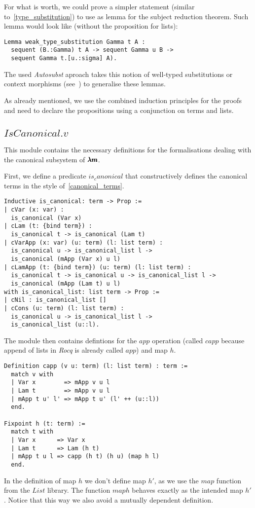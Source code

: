 For what is worth, we could prove a simpler statement (similar to~\cref{type_substitution}) to use as lemma for the subject reduction theorem.
Such lemma would look like (without the proposition for lists):
\begin{lstlisting}[language=Coq]
Lemma weak_type_substitution Gamma t A :
  sequent (B.:Gamma) t A -> sequent Gamma u B ->
  sequent Gamma t.[u.:sigma] A).
\end{lstlisting}

The used \textit{Autosubst} aproach takes this notion of well-typed substitutions or context morphisms (see~\cite[Chapter~4]{AutosubstSchafer}) to generalise these lemmas.

As already mentioned, we use the combined induction principles for the proofs and need to declare the propositions using a conjunction on terms and lists.

\subsection{\lst$IsCanonical.v$}

This module contains the necessary definitions for the formalisations dealing with the canonical subsystem of $\pmb{\lambda m}$.

First, we define a predicate \lst$is_canonical$ that constructively defines the canonical terms in the style of~\cref{canonical_terms}.
\begin{lstlisting}[language=Coq]
Inductive is_canonical: term -> Prop :=
| cVar (x: var) :
  is_canonical (Var x)
| cLam (t: {bind term}) :
  is_canonical t -> is_canonical (Lam t)
| cVarApp (x: var) (u: term) (l: list term) :
  is_canonical u -> is_canonical_list l ->
  is_canonical (mApp (Var x) u l)
| cLamApp (t: {bind term}) (u: term) (l: list term) :
  is_canonical t -> is_canonical u -> is_canonical_list l ->
  is_canonical (mApp (Lam t) u l)
with is_canonical_list: list term -> Prop :=
| cNil : is_canonical_list []
| cCons (u: term) (l: list term) :
  is_canonical u -> is_canonical_list l ->
  is_canonical_list (u::l).
\end{lstlisting}

The module then contains defintions for the $app$ operation (called \lst$capp$ because append of lists in \textit{Rocq} is already called \lst$app$) and map $h$.
\begin{lstlisting}[language=Coq]
Definition capp (v u: term) (l: list term) : term :=
  match v with
  | Var x        => mApp v u l
  | Lam t        => mApp v u l
  | mApp t u' l' => mApp t u' (l' ++ (u::l))
  end.

Fixpoint h (t: term) :=
  match t with
  | Var x      => Var x
  | Lam t      => Lam (h t)
  | mApp t u l => capp (h t) (h u) (map h l)
  end.
\end{lstlisting}
In the definition of map $h$ we don't define map $h'$, as we use the \lst$map$ function from the \lst$List$ library.
The function \lst$map h$ behaves exactly as the intended map $h'$.
Notice that this way we also avoid a mutually dependent definition.

